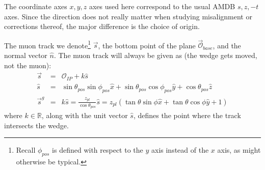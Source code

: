 The coordinate axes $x,y,z$ axes used here correspond to the usual AMDB $s,z,-t$ axes.  Since the direction does not really matter when studying misalignment or corrections thereof, the major difference is the choice of origin.

The muon track we denote\footnote{Recall $\phi_{pos}$ is defined with respect to the $y$ axis instead of the $x$ axis, as might otherwise be typical.} $\vec{s}$, the bottom point of the plane $\vec{\mathscr{O}}_{base}$, and the normal vector $\hat{n}$.  The muon track will always be given as (the wedge gets moved, not the muon):
\begin{eqnarray}
\vec{s}&=&\mathscr{O}_{IP}+k\hat{s}\\
\hat{s}&=&\sin\theta_{pos}\sin\phi_{pos}\hat{x}+\sin\theta_{pos}\cos\phi_{pos}\hat{y}+\cos\theta_{pos}\hat{z}\\
\vec{s}^g&=&k\hat{s}=\frac{z_{pl}}{\cos\theta_{pos}}\hat{s}=z_{pl}\left(\tan\theta\sin\phi\hat{x}+\tan\theta\cos\phi\hat{y}+1\right)
\end{eqnarray}
where $k\in\mathbb{R}$, along with the unit vector $\hat{s}$, defines the point where the track intersects the wedge.


